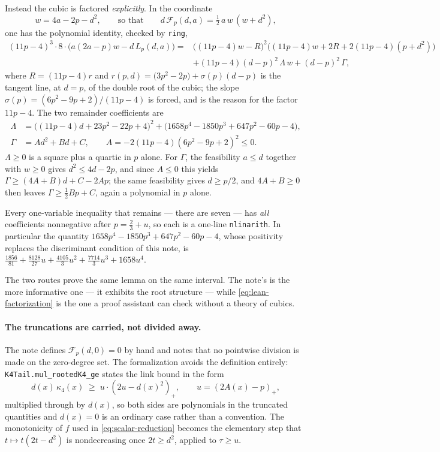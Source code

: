 \documentclass[11pt]{article}
\begin{document}
Instead the cubic is factored \emph{explicitly}.  In the coordinate
\[
 w=4a-2p-d^2,\qquad\text{so that}\qquad d\,\mathcal F_p(d,a)=\tfrac12\,a\,w\,(w+d^2),
\]
one has the polynomial identity, checked by \texttt{ring},
\begin{equation}
\begin{aligned}
 (11p-4)^3\cdot8\cdot\bigl(a(2a-p)w-d\,L_p(d,a)\bigr)
 ={}&\bigl((11p-4)w-R\bigr)^2\bigl((11p-4)w+2R+2(11p-4)(p+d^2)\bigr)\\
 &+(11p-4)(d-p)^2\,\Lambda\,w
 +(d-p)^2\,\Gamma,
\end{aligned}
 \label{eq:lean-factorization}
\end{equation}
where $R=(11p-4)r$ and $r(p,d)=\bigl(3p^2-2p\bigr)+\sigma(p)(d-p)$ is the
tangent line, at $d=p$, of the double root of the cubic; the slope
$\sigma(p)=(6p^2-9p+2)/(11p-4)$ is forced, and is the reason for the factor
$11p-4$.  The two remainder coefficients are
\begin{align*}
 \Lambda&=\bigl((11p-4)d+23p^2-22p+4\bigr)^2+\bigl(1658p^4-1850p^3+647p^2-60p-4\bigr),\\
 \Gamma&=Ad^2+Bd+C,\qquad A=-2(11p-4)(6p^2-9p+2)^2\leq0 .
\end{align*}
$\Lambda\geq0$ is a square plus a quartic in $p$ alone.  For $\Gamma$, the
feasibility $a\leq d$ together with $w\geq0$ gives $d^2\leq4d-2p$, and since
$A\leq0$ this yields $\Gamma\geq(4A+B)d+C-2Ap$; the same feasibility gives
$d\geq p/2$, and $4A+B\geq0$ then leaves $\Gamma\geq\tfrac12Bp+C$, again a
polynomial in $p$ alone.

Every one-variable inequality that remains --- there are seven --- has
\emph{all} coefficients nonnegative after $p=\tfrac23+u$, so each is a one-line
\texttt{nlinarith}.  In particular the quantity
$1658p^4-1850p^3+647p^2-60p-4$, whose positivity replaces the discriminant
condition of this note, is $\tfrac{1856}{81}+\tfrac{8128}{27}u+\tfrac{4105}{3}u^2+\tfrac{7714}{3}u^3+1658u^4$.

The two routes prove the same lemma on the same interval.  The note's is the
more informative one --- it exhibits the root structure --- while
\eqref{eq:lean-factorization} is the one a proof assistant can check without a
theory of cubics.

\paragraph{The truncations are carried, not divided away.}
The note defines $\mathcal F_p(d,0)=0$ by hand and notes that no pointwise
division is made on the zero-degree set.  The formalization avoids the
definition entirely: \texttt{K4Tail.mul\_rootedK4\_ge} states the link bound in
the form
\[
 d(x)\,\kappa_4(x)\;\geq\;u\cdot(2u-d(x)^2)_+,\qquad u=(2A(x)-p)_+,
\]
multiplied through by $d(x)$, so both sides are polynomials in the truncated
quantities and $d(x)=0$ is an ordinary case rather than a convention.  The
monotonicity of $f$ used in \eqref{eq:scalar-reduction} becomes the elementary
step that $t\mapsto t(2t-d^2)$ is nondecreasing once $2t\geq d^2$, applied to
$\tau\geq u$.
\end{document}
